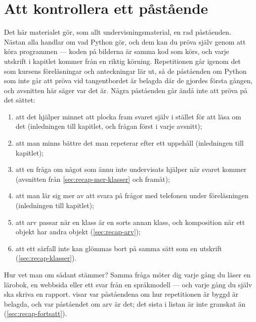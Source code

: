 \chapter{Att kontrollera ett påstående}
\label{app:recap-verifiera}

Det här materialet gör, som allt undervisningsmaterial, en rad
påståenden.  Nästan alla handlar om vad Python gör, och dem kan du pröva
själv genom att köra programmen --- koden på bilderna är samma kod som
körs, och varje utskrift i kapitlet kommer från en riktig körning.
Repetitionen går igenom det som kursens föreläsningar och anteckningar
lär ut, så de påståenden om Python som inte går att pröva vid
tangentbordet är belagda där de gjordes första gången, och avsnitten här
säger var det är.
Några påståenden går ändå inte att pröva på det sättet:
\begin{enumerate}
  \item att det hjälper minnet att plocka fram svaret själv i stället för
    att läsa om det (inledningen till kapitlet, och frågan
    först i varje avsnitt);
  \item att man minns bättre det man repeterar efter ett uppehåll
    (inledningen till kapitlet);
  \item att en fråga om något som ännu inte undervisats hjälper när
    svaret kommer (avsnitten från \cref{sec:recap-mer-klasser} och framåt);
  \item att man lär sig mer av att svara på frågor med telefonen under
    föreläsningen (inledningen till kapitlet);
  \item att arv passar när en klass är en sorts annan klass, och
    komposition när ett objekt har andra objekt
    (\cref{sec:recap-arv});
  \item att ett särfall inte kan glömmas bort på samma sätt som en
    utskrift (\cref{sec:recap-klasser}).
\end{enumerate}
Hur vet man om sådant stämmer?  Samma fråga möter dig varje gång du läser
en lärobok, en webbsida eller ett svar från en språkmodell --- och varje
gång du själv ska skriva en rapport.
 visar var påståendena om hur repetitionen är
byggd är belagda, och var påståendet om arv är det;
det sista i listan är inte granskat än (\cref{sec:recap-fortsatt}).


